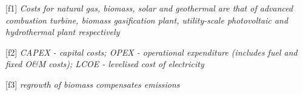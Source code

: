 {[}f1{]} \emph{Costs for natural gas, biomass, solar and geothermal are
that of advanced combustion turbine, biomass gasification plant,
utility-scale photovoltaic and hydrothermal plant respectively}

{[}f2{]} \emph{CAPEX - capital costs; OPEX - operational expenditure
(includes fuel and fixed O\&M costs); LCOE - levelised cost of
electricity}

{[}f3{]} \emph{regrowth of biomass compensates emissions}
